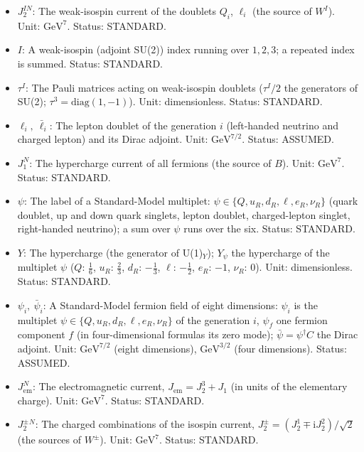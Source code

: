 \documentclass[
  10pt,
]{article}
\begin{document}
\begin{itemize}
  \(\mathrm{GeV}^{7/2}\). Status: ASSUMED.
\item
  \(J_2^{IN}\): The weak-isospin current of the doublets \(Q_i\),
  \(\ell_i\) (the source of \(W^I\)). Unit: \(\mathrm{GeV}^{7}\).
  Status: STANDARD.
\item
  \(I\): A weak-isospin (adjoint SU(2)) index running over \(1, 2, 3\);
  a repeated index is summed. Status: STANDARD.
\item
  \(\tau^I\): The Pauli matrices acting on weak-isospin doublets
  (\(\tau^I/2\) the generators of SU(2);
  \(\tau^3 = \mathrm{diag}(1, -1)\)). Unit: dimensionless. Status:
  STANDARD.
\item
  \(\ell_i,\ \bar\ell_i\): The lepton doublet of the generation \(i\)
  (left-handed neutrino and charged lepton) and its Dirac adjoint. Unit:
  \(\mathrm{GeV}^{7/2}\). Status: ASSUMED.
\item
  \(J_1^N\): The hypercharge current of all fermions (the source of
  \(B\)). Unit: \(\mathrm{GeV}^{7}\). Status: STANDARD.
\item
  \(\psi\): The label of a Standard-Model multiplet:
  \(\psi \in \{Q, u_R, d_R, \ell, e_R, \nu_R\}\) (quark doublet, up and
  down quark singlets, lepton doublet, charged-lepton singlet,
  right-handed neutrino); a sum over \(\psi\) runs over the six. Status:
  STANDARD.
\item
  \(Y\): The hypercharge (the generator of U(1)\(_Y\)); \(Y_\psi\) the
  hypercharge of the multiplet \(\psi\) (\(Q\): \(\frac16\), \(u_R\):
  \(\frac23\), \(d_R\): \(-\frac13\), \(\ell\): \(-\frac12\), \(e_R\):
  \(-1\), \(\nu_R\): 0). Unit: dimensionless. Status: STANDARD.
\item
  \(\psi_i,\ \bar\psi_i\): A Standard-Model fermion field of eight
  dimensions: \(\psi_i\) is the multiplet
  \(\psi \in \{Q, u_R, d_R, \ell, e_R, \nu_R\}\) of the generation
  \(i\), \(\psi_f\) one fermion component \(f\) (in four-dimensional
  formulas its zero mode); \(\bar\psi = \psi^\dagger C\) the Dirac
  adjoint. Unit: \(\mathrm{GeV}^{7/2}\) (eight dimensions),
  \(\mathrm{GeV}^{3/2}\) (four dimensions). Status: ASSUMED.
\item
  \(J_{\mathrm{em}}^N\): The electromagnetic current,
  \(J_{\mathrm{em}} = J_2^3 + J_1\) (in units of the elementary charge).
  Unit: \(\mathrm{GeV}^{7}\). Status: STANDARD.
\item
  \(J_2^{\pm}{}^N\): The charged combinations of the isospin current,
  \(J_2^\pm = (J_2^1 \mp \mathrm{i}J_2^2)/\sqrt2\) (the sources of
  \(W^\pm\)). Unit: \(\mathrm{GeV}^{7}\). Status: STANDARD.
\end{itemize}
\end{document}
